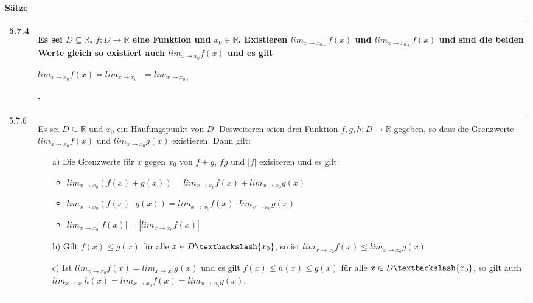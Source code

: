     \noindent 
    \textbf{Sätze}
    \begin{table}[H]
    \begin{tabularx}{\textwidth}{X m{16cm}}
        \toprule

        5.7.4 & Es sei $D \subseteq \mathbb{R}$, $f: D \rightarrow \mathbb{R}$ eine Funktion und $x_0 \in \mathbb{R}$. 
                Existieren $lim_{x \rightarrow x_{0-}}f(x)$ und $lim_{x \rightarrow x_{0+}}f(x)$ und sind die beiden Werte gleich
                so existiert auch $lim_{x \rightarrow x_0} f(x)$ und es gilt \hfill \break
                \centerline{$lim_{x \rightarrow x_0} f(x) = lim_{x \rightarrow x_{0-}} = lim_{x \rightarrow x_{0+}}$}.  \\
        \midrule
        5.7.6 & Es sei $D \subseteq \mathbb{R}$ und $x_0$ ein Häufungspunkt von $D$. Desweiteren seien drei Funktion $f,g,h:
                D \rightarrow \mathbb{R}$ gegeben, so dass die Grenzwerte $lim_{x \rightarrow x_0} f(x)$ und
                $lim_{x \rightarrow x_0} g(x)$ existieren. Dann gilt:
                \begin{itemize}[topsep=-0.5cm]
                    \item[a)] Die Grenzwerte für $x$ gegen $x_0$ von $f+g$, $fg$ und $|f|$ exisiteren und es gilt:
                        \begin{itemize}[topsep=-0.5cm]
                            \item $lim_{x \rightarrow x_0} (f(x) + g(x)) = lim_{x \rightarrow x_0} f(x) + lim_{x \rightarrow x_0} g(x)$
                            \item $lim_{x \rightarrow x_0} (f(x) \cdot g(x)) = lim_{x \rightarrow x_0} f(x) \cdot lim_{x \rightarrow x_0} g(x)$
                            \item $lim_{x \rightarrow x_0} |f(x)| = |lim_{x \rightarrow x_0} f(x)|$
                        \end{itemize}
                    \item[b)] Gilt $f(x) \leq g(x)$ für alle $x \in D \textbackslash \{x_0\}$, so ist $lim_{x \rightarrow x_0} f(x)
                                \leq lim_{x \rightarrow x_0}g(x)$
                    \item[c)] Ist $lim_{x \rightarrow x_0} f(x) = lim_{x \rightarrow x_0} g(x)$ und es gilt 
                                $f(x) \leq h(x) \leq g(x)$ für alle $x \in D \textbackslash \{x_0\}$, so gilt auch
                                $lim_{x \rightarrow x_0} h(x) = lim_{x \rightarrow x_0}f(x) = lim_{x \rightarrow x_0}g(x)$.

\end{itemize}
\end{tabularx}
\end{table}
